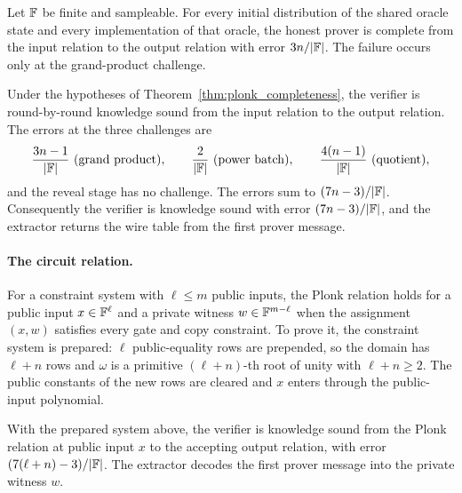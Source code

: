 \begin{theorem}\label{thm:plonk_completeness}
\leanok
{}
Let $\mathbb{F}$ be finite and sampleable. For every initial distribution of the shared oracle
state and every implementation of that oracle, the honest prover is complete from the input
relation to the output relation with error $3n/|\mathbb{F}|$. The failure occurs only at the
grand-product challenge.
\end{theorem}

\begin{theorem}\label{thm:plonk_knowledge_soundness}
\leanok
{}
Under the hypotheses of Theorem~\ref{thm:plonk_completeness}, the verifier is
round-by-round knowledge sound from the input relation to the output relation. The errors
at the three challenges are
\[
  \frac{3n-1}{|\mathbb{F}|}\ \text{(grand product)},\qquad
  \frac{2}{|\mathbb{F}|}\ \text{(power batch)},\qquad
  \frac{4(n-1)}{|\mathbb{F}|}\ \text{(quotient)},
\]
and the reveal stage has no challenge. The errors sum to $(7n-3)/|\mathbb{F}|$. Consequently
the verifier is knowledge sound with error $(7n-3)/|\mathbb{F}|$, and the extractor returns
the wire table from the first prover message.
\end{theorem}

\paragraph{The circuit relation.}
For a constraint system with $\ell\leq m$ public inputs, the Plonk relation holds for a
public input $x\in\mathbb{F}^{\ell}$ and a private witness $w\in\mathbb{F}^{m-\ell}$ when the
assignment $(x,w)$ satisfies every gate and copy constraint. To prove it, the constraint
system is prepared: $\ell$ public-equality rows are prepended, so the domain has $\ell+n$
rows and $\omega$ is a primitive $(\ell+n)$-th root of unity with $\ell+n\geq 2$. The
public constants of the new rows are cleared and $x$ enters through the public-input
polynomial.

\begin{theorem}
\label{thm:plonk_circuit_knowledge_soundness}
\leanok
{}
With the prepared system above, the verifier is knowledge sound from the Plonk relation at
public input $x$ to the accepting output relation, with error
$(7(\ell+n)-3)/|\mathbb{F}|$. The extractor decodes the first prover message into the private
witness $w$.
\end{theorem}
